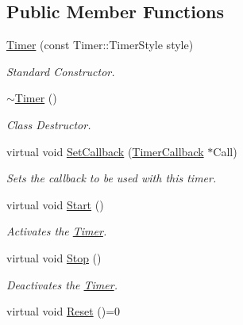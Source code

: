 \subsection*{Public Member Functions}
\begin{DoxyCompactItemize}
\item 
\hyperlink{classphys_1_1Timer_a25b70d2d45c5c56cce475841b7b18cd0}{Timer} (const Timer::TimerStyle style)
\begin{DoxyCompactList}\small\item\em Standard Constructor. \item\end{DoxyCompactList}\item 
\hypertarget{classphys_1_1Timer_ab96eede362c41f1ab56f1530cbae22b8}{
\hyperlink{classphys_1_1Timer_ab96eede362c41f1ab56f1530cbae22b8}{$\sim$Timer} ()}
\label{d3/d83/classphys_1_1Timer_ab96eede362c41f1ab56f1530cbae22b8}

\begin{DoxyCompactList}\small\item\em Class Destructor. \item\end{DoxyCompactList}\item 
virtual void \hyperlink{classphys_1_1Timer_a046ca4f7dcf2503e5993a18e11172f5e}{SetCallback} (\hyperlink{classphys_1_1TimerCallback}{TimerCallback} $\ast$Call)
\begin{DoxyCompactList}\small\item\em Sets the callback to be used with this timer. \item\end{DoxyCompactList}\item 
\hypertarget{classphys_1_1Timer_a2ec14a41cda7c31637351ab63f63304a}{
virtual void \hyperlink{classphys_1_1Timer_a2ec14a41cda7c31637351ab63f63304a}{Start} ()}
\label{d3/d83/classphys_1_1Timer_a2ec14a41cda7c31637351ab63f63304a}

\begin{DoxyCompactList}\small\item\em Activates the \hyperlink{classphys_1_1Timer}{Timer}. \item\end{DoxyCompactList}\item 
\hypertarget{classphys_1_1Timer_aa934478424678f84e8f4afb472eebbae}{
virtual void \hyperlink{classphys_1_1Timer_aa934478424678f84e8f4afb472eebbae}{Stop} ()}
\label{d3/d83/classphys_1_1Timer_aa934478424678f84e8f4afb472eebbae}

\begin{DoxyCompactList}\small\item\em Deactivates the \hyperlink{classphys_1_1Timer}{Timer}. \item\end{DoxyCompactList}\item 
\hypertarget{classphys_1_1Timer_a6010a6dab70b542c3e9d5a09caa422f7}{
virtual void \hyperlink{classphys_1_1Timer_a6010a6dab70b542c3e9d5a09caa422f7}{Reset} ()=0}
\label{d3/d83/classphys_1_1Timer_a6010a6dab70b542c3e9d5a09caa422f7}


\end{DoxyCompactItemize}
